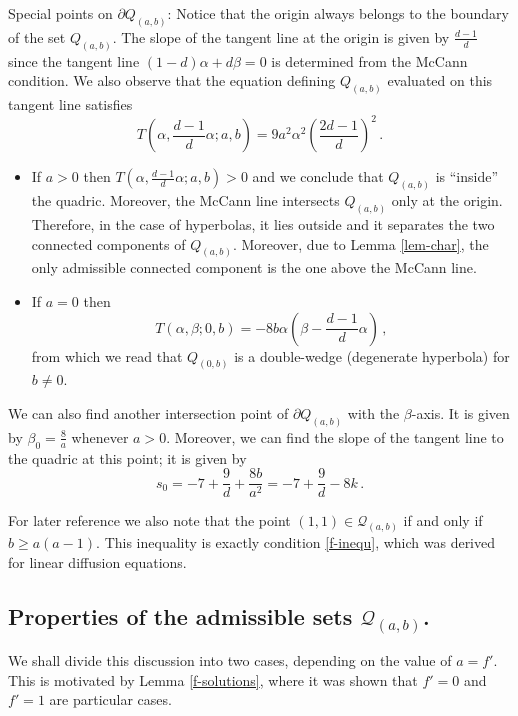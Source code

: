 \documentclass[reqno]{amsart}
\newcommand{\Q}{{\mathcal{Q}}}
\begin{document}
Special points on $\partial Q_{(a,b)}$: Notice that the origin always belongs to the boundary of the set $Q_{(a,b)}$. The slope of the tangent line at the origin is given by
$\frac{d-1}{d}$ since the tangent line $(1-d)\alpha+d\beta=0$ is determined from the McCann condition. We also observe that the equation defining $Q_{(a,b)}$ evaluated on this tangent line satisfies
$$
T\left(\alpha, \frac{d-1}{d}\alpha; a,b\right)=9a^2\alpha^2\left(\frac{2d-1}{d}\right)^2\,.
$$
\begin{itemize}
\item 
If $a> 0$ then $T\left(\alpha, \frac{d-1}{d}\alpha; a,b\right)>0$ and we conclude that $Q_{(a,b)}$ is ``inside'' the quadric. Moreover, the McCann line intersects $Q_{(a,b)}$ only at the origin. Therefore, in the case of hyperbolas, it lies outside and it separates the two connected components of $Q_{(a,b)}$. Moreover, due to Lemma \ref{lem-char}, the only admissible connected component is the one above the McCann line.

\item If $a=0$ then
\begin{equation}\label{a0-case}
T\left(\alpha, \beta; 0,b\right)=-8b\alpha\left(\beta-\frac{d-1}{d}\alpha\right)\,,
\end{equation}
from which we read that $Q_{(0,b)}$ is a double-wedge (degenerate hyperbola) for $b\neq 0$.
\end{itemize}

We can also find another intersection point of $\partial Q_{(a,b)}$ with the $\beta$-axis. It is given by $\beta_0=\frac{8}{a}$ whenever $a> 0$. Moreover, we can find the slope of the tangent line to the quadric at this point; it is given by
$$
s_0=-7+\frac{9}{d}+\frac{8b}{a^2}=-7+\frac{9}{d}-8k\,.
$$

For later reference we also note that the point $(1,1)\in \Q_{(a,b)}$ if and only if $b\ge a(a-1)$. This inequality is exactly condition \eqref{f-inequ}, which was derived for linear diffusion equations.

\subsection{Properties of the admissible sets $\mathcal{Q}_{(a,b)}$.}\label{sec:admiss-sets}
%
We shall divide this discussion into two cases, depending on the value of $a=f'$. This is motivated by Lemma \ref{f-solutions}, where it was shown that $f'=0$ and $f'=1$ are particular cases.\\
\end{document}
